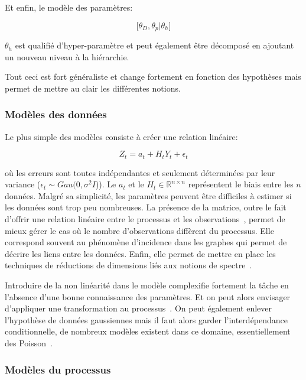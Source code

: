 Et enfin, le modèle des paramètres:

\begin{equation}
    \lbrack \theta_{D}, \theta_{p} | \theta_{h} \rbrack
\end{equation}

$ \theta_{h} $ est qualifié d'hyper-paramètre et peut également être décomposé en ajoutant un nouveau niveau à la hiérarchie.

Tout ceci  est fort généraliste et change fortement en fonction des hypothèses mais permet de mettre au clair les différentes notions.

\subsubsection{Modèles des données}

Le plus simple des modèles consiste à créer une relation linéaire:

\begin{equation}
    Z_{t} = a_{t} + H_{t} Y_{t} + \epsilon_{t}
\end{equation}

où les erreurs sont toutes indépendantes et seulement déterminées par leur variance ($\epsilon_{t} \sim Gau(0, \sigma^{2}I$)). Le $a_{t}$ et le $H_{t} \in \mathbb{R}^{n\times n}$ représentent le biais entre les $n$ données. Malgré sa simplicité, les paramètres peuvent être difficiles à estimer si les données sont trop peu nombreuses. La présence de la matrice, outre le fait d'offrir une relation linéaire entre le processus et les observations~\cite{gotway2002combining}, permet de mieux gérer le cas où le nombre d'observations diffèrent du processus. Elle correspond souvent au phénomène d'incidence dans les graphes qui permet de décrire les liens entre les données. Enfin, elle permet de mettre en place les techniques de réductions de dimensions liés aux notions de spectre~\cite{wikle2001spatiotemporal, gelfand2010handbook}.

Introduire de la non linéarité dans le modèle complexifie fortement la tâche en l'absence d'une bonne connaissance des paramètres. Et on peut alors envisager d'appliquer une transformation au processus~\cite{sanso1999venezuelan}. On peut également enlever l'hypothèse de données gaussiennes mais il faut alors garder l'interdépendance conditionnelle, de nombreux modèles existent dans ce domaine, essentiellement des Poisson~\cite{banerjee2014hierarchical}.

\subsubsection{Modèles du processus}

